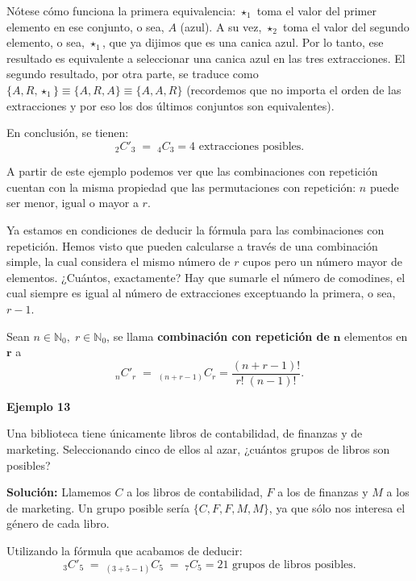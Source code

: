 \documentclass[
  letterpaper,
  DIV=11,
  numbers=noendperiod]{scrreprt}
\begin{document}
\begin{examplebox}
\begin{flexcenter}
\begin{half}
\end{half}

\end{flexcenter}

Nótese cómo funciona la primera equivalencia: \(\star_1\) toma el valor
del primer elemento en ese conjunto, o sea, \(A\) (azul). A su vez,
\(\star_2\) toma el valor del segundo elemento, o sea, \(\star_1\), que
ya dijimos que es una canica azul. Por lo tanto, ese resultado es
equivalente a seleccionar una canica azul en las tres extracciones. El
segundo resultado, por otra parte, se traduce como
\(\{A,R,\star_1\} \equiv \{A,R,A\} \equiv \{A,A,R\}\) (recordemos que no
importa el orden de las extracciones y por eso los dos últimos conjuntos
son equivalentes).

En conclusión, se tienen:
\[_2C'_3 \;=\; _4C_3 = 4 \text{ extracciones posibles.}\]

\end{examplebox}

A partir de este ejemplo podemos ver que las combinaciones con
repetición cuentan con la misma propiedad que las permutaciones con
repetición: \(n\) puede ser menor, igual o mayor a \(r\).

Ya estamos en condiciones de deducir la fórmula para las combinaciones
con repetición. Hemos visto que pueden calcularse a través de una
combinación simple, la cual considera el mismo número de \(r\) cupos
pero un número mayor de elementos. ¿Cuántos, exactamente? Hay que
sumarle el número de comodines, el cual siempre es igual al número de
extracciones exceptuando la primera, o sea, \(r-1\).

Sean \(n \in \mathbb{N}_0, \; r \in \mathbb{N}_0\), se llama
\textbf{combinación con repetición de} \(\mathbf{n}\) elementos en
\(\mathbf{r}\) a
\[_nC'_r \; = \; _{(n+r-1)}C_r = \dfrac{(n+r-1)!}{r! \; (n-1)!}.\]

\begin{examplebox}

\begin{center}
\textbf{Ejemplo 13}

\end{center}

Una biblioteca tiene únicamente libros de contabilidad, de finanzas y de
marketing. Seleccionando cinco de ellos al azar, ¿cuántos grupos de
libros son posibles?

\textbf{Solución:} Llamemos \(C\) a los libros de contabilidad, \(F\) a
los de finanzas y \(M\) a los de marketing. Un grupo posible sería
\(\{C,F,F,M,M\}\), ya que sólo nos interesa el género de cada libro.

Utilizando la fórmula que acabamos de deducir:
\[_3C'_5 \;=\; _{(3+5-1)}C_5 \;=\; _7C_5 = 21 \text{ grupos de libros posibles.}\]

\end{examplebox}
\end{document}
